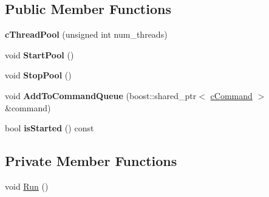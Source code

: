 \subsection*{\-Public \-Member \-Functions}
\begin{DoxyCompactItemize}
\item 
\hypertarget{classengine_1_1cThreadPool_a1cef23416a63c1a652d07b074a40b42e}{{\bfseries c\-Thread\-Pool} (unsigned int num\-\_\-threads)}\label{classengine_1_1cThreadPool_a1cef23416a63c1a652d07b074a40b42e}

\item 
\hypertarget{classengine_1_1cThreadPool_a97cf0269aebd226e59d973a89181d709}{void {\bfseries \-Start\-Pool} ()}\label{classengine_1_1cThreadPool_a97cf0269aebd226e59d973a89181d709}

\item 
\hypertarget{classengine_1_1cThreadPool_aeafab9fa5546e10b0deebff1e8df60d9}{void {\bfseries \-Stop\-Pool} ()}\label{classengine_1_1cThreadPool_aeafab9fa5546e10b0deebff1e8df60d9}

\item 
\hypertarget{classengine_1_1cThreadPool_a99a6a1dc9361e4c17786ad32b17e7706}{void {\bfseries \-Add\-To\-Command\-Queue} (boost\-::shared\-\_\-ptr$<$ \hyperlink{classengine_1_1cCommand}{c\-Command} $>$ \&command)}\label{classengine_1_1cThreadPool_a99a6a1dc9361e4c17786ad32b17e7706}

\item 
\hypertarget{classengine_1_1cThreadPool_a207b8bcf506d3cd151f0fc815772111c}{bool {\bfseries is\-Started} () const }\label{classengine_1_1cThreadPool_a207b8bcf506d3cd151f0fc815772111c}

\end{DoxyCompactItemize}
\subsection*{\-Private \-Member \-Functions}
\begin{DoxyCompactItemize}
\item 
void \hyperlink{classengine_1_1cThreadPool_af573f11026d6b6079c56af7e50df5ca6}{\-Run} ()
\end{DoxyCompactItemize}
